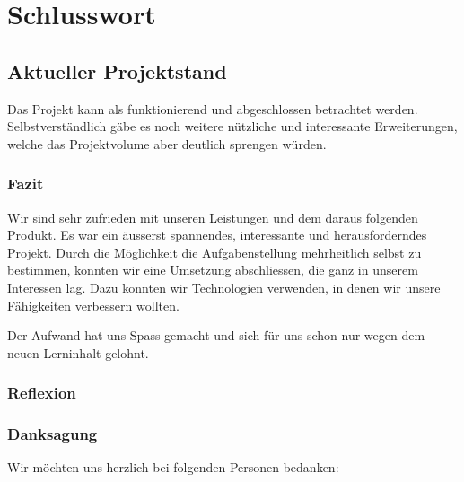 
\chapter{Schlusswort}
\label{chap:Schlusswort}
\section{Aktueller Projektstand}
Das Projekt kann als funktionierend und abgeschlossen betrachtet werden. Selbstverständlich gäbe es noch weitere nützliche und interessante Erweiterungen, welche das Projektvolume aber deutlich sprengen würden.

\subsection{Fazit}
Wir sind sehr zufrieden mit unseren Leistungen und dem daraus folgenden Produkt. Es war ein äusserst spannendes, interessante und herausforderndes Projekt. Durch die Möglichkeit die Aufgabenstellung mehrheitlich selbst zu bestimmen, konnten wir eine Umsetzung abschliessen, die ganz in unserem Interessen lag. Dazu konnten wir Technologien verwenden, in denen wir unsere Fähigkeiten verbessern wollten.

Der Aufwand hat uns Spass gemacht und sich für uns schon nur wegen dem neuen Lerninhalt gelohnt.





\subsection{Reflexion}



\subsection{Danksagung}
Wir möchten uns herzlich bei folgenden Personen bedanken:\\
\vspace{0.5cm}

